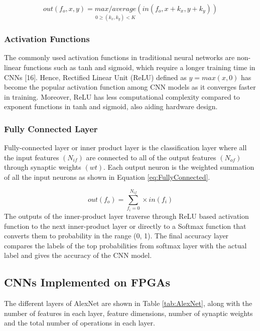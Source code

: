 \documentclass[11pt]{article}
\begin{document}
\begin{equation}
out(f_o,x,y)=\underset{0\geqslant (k_x,k_y)<K}{max/average}(in(f_o,x+k_x,y+k_y))
\label{eq:Pool}
\end{equation}

\subsubsection{Activation Functions}
\label{sec:Background-CNN-Activation}

The commonly used activation functions in traditional neural
networks are non-linear functions such as tanh and sigmoid,
which require a longer training time in CNNs [16]. Hence,
Rectified Linear Unit (ReLU) defined as $y = max(x,0)$ has become
the popular activation function among CNN models as it
converges faster in training. Moreover, ReLU has less
computational complexity compared to exponent functions in tanh
and sigmoid, also aiding hardware design.

\subsubsection{Fully Connected Layer}
\label{sec:Background-CNN-FC}

Fully-connected layer or inner product layer is the classification layer where all the input features $(N_{if})$ are connected to all of the output features $(N_{of})$ through synaptic weights $(wt)$. Each output neuron is the weighted summation of all the input
neurons as shown in Equation \ref{eq:FullyConnected}.

\begin{equation}
out(f_o)=\sum^{N_{if}}_{f_i=0}\times in(f_i)
\label{eq:FullyConnected}
\end{equation}
The outputs of the inner-product layer traverse through
ReLU based activation function to the next inner-product layer or
directly to a Softmax function that converts them to probability in
the range (0, 1). The final accuracy layer compares the labels of
the top probabilities from softmax layer with the actual label and
gives the accuracy of the CNN model.

\subsection{CNNs Implemented on FPGAs}
\label{sec:Background-CNNsImplementedOnFPGAs}

The different layers of AlexNet are shown in Table \ref{tab:AlexNet}, along with the number of features in each layer, feature dimensions, number of synaptic weights and the total number of operations in each layer.
\end{document}
